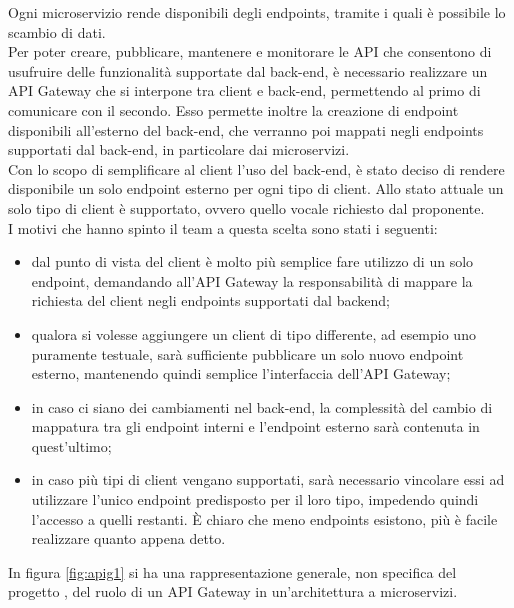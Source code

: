 Ogni microservizio rende disponibili degli endpoints, tramite i quali è possibile lo scambio di dati. \\
Per poter creare, pubblicare, mantenere e monitorare le API che consentono di usufruire delle funzionalità supportate dal back-end, è necessario realizzare un API Gateway che si interpone tra client e back-end, permettendo al primo di comunicare con il secondo.
Esso permette inoltre la creazione di endpoint disponibili all'esterno del back-end, che verranno poi mappati negli endpoints supportati dal back-end, in particolare dai microservizi.\\
Con lo scopo di semplificare al client l'uso del back-end, è stato deciso di rendere disponibile un solo endpoint esterno per ogni tipo di client. Allo stato attuale un solo tipo di client è supportato, ovvero quello vocale richiesto dal proponente.\\
I motivi che hanno spinto il team a questa scelta sono stati i seguenti:
\begin{itemize}
	\item dal punto di vista del client è molto più semplice fare utilizzo di un solo endpoint, demandando all'API Gateway la responsabilità di mappare la richiesta del client negli endpoints supportati dal backend;
	\item qualora si volesse aggiungere un client di tipo differente, ad esempio uno puramente testuale, sarà sufficiente pubblicare un solo nuovo endpoint esterno, mantenendo quindi semplice l'interfaccia dell'API Gateway;
	\item in caso ci siano dei cambiamenti nel back-end, la complessità del cambio di mappatura tra gli endpoint interni e l'endpoint esterno sarà contenuta in quest'ultimo;
	\item in caso più tipi di client vengano supportati, sarà necessario vincolare essi ad utilizzare l'unico endpoint predisposto per il loro tipo, impedendo quindi l'accesso a quelli restanti. È chiaro che meno endpoints esistono, più è facile realizzare quanto appena detto.
\end{itemize}

In figura \ref{fig:apig1} si ha una rappresentazione generale, non specifica del progetto \PROGETTO, del ruolo di un API Gateway in un'architettura a microservizi.\\

